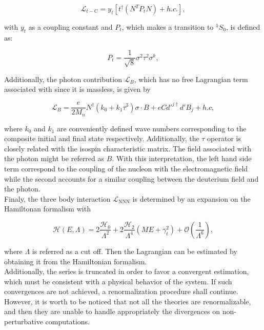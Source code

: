 \documentclass[openany]{book}
\begin{document}
\begin{equation}\label{eq:micro_EFT_lagrangian_t_coupling}
	\mathcal{L}_{t-\mathrm{C}}  = y_t [t^{\dagger} (N^{T} P_t N) + h.c.],
\end{equation}

with $y_t$ as a coupling constant and $P_t$, which makes a transition to $^{1}S_0$, is defined as: 

\begin{equation}\label{eq:micro_EFT_Pt}
	P_t = \frac{1}{\sqrt{8}} \sigma^2 \tau^2 \sigma^k,
\end{equation}

Additionally, the photon contribution $\mathcal{L}_B$, which has no free Lagrangian term associated with since it is massless,  is given by 

\begin{equation}\label{eq:micro_EFT_lagrangian_B}
	\mathcal{L}_B = \frac{e}{2M_n} N^\dagger (k_0 + k_1 \tau^3) \sigma \cdot B + e C d'^{j\dagger}  d' B_j + h.c,
\end{equation}

where $k_0$ and $k_1$ are conveniently defined wave numbers corresponding to the composite initial and final state respectively. Additionally, the $\tau$ operator is closely related with the isospin characteristic matrix. The field associated with the photon might be referred as $B$. With this interpretation, the left hand side term correspond to the coupling of the nucleon with the electromagnetic field while the second accounts for a similar coupling between the deuterium field and the photon.  \\

Finaly, the three body interaction $\mathcal{L}_{\mathrm{NNN}}$ is determined by an expansion on the Hamiltonan formalism with 

\begin{equation}\label{eq:micro_EFT_lagrangian_hamiltonianNNN}
	\mathcal{H}(E, \Lambda ) = 2  \frac{\mathcal{H}_0}{\Lambda^2} + 2 \frac{\mathcal{H}_2}{\Lambda^4}(ME + \gamma^2_t) + \mathcal{O} \left( \frac{1}{\Lambda^6} \right),
\end{equation}

where $\Lambda$ is referred as a cut off. Then the Lagrangian can be estimated by obtaining it from the Hamiltonian formalism. \\

Additionally, the series is truncated in order to favor a convergent estimation, which must be consistent with a physical behavior of the system. If such convergences are not achieved, a renormalization procedure shall continue. However, it is worth to be noticed that not all the theories are renormalizable, and then they are unable to handle appropriately the divergences on non-perturbative computations. \\
\end{document}
